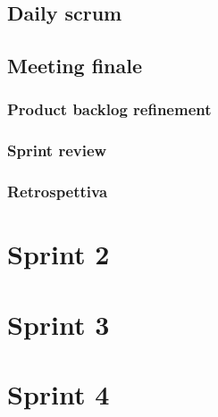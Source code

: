     \subsection{Daily scrum}
    \subsection{Meeting finale}
        \subsubsection{Product backlog refinement}
        \subsubsection{Sprint review}
        \subsubsection{Retrospettiva}

    
\section{Sprint 2}


\section{Sprint 3}


\section{Sprint 4}


